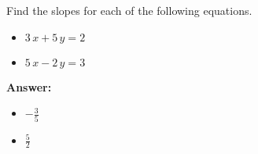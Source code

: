  Find the slopes for each of the following equations. \begin{itemize}\item \( 3 \, x + 5 \, y = 2 \)\item \( 5 \, x - 2 \, y = 3 \)\end{itemize}

        \textbf{Answer:} \begin{itemize}\item \( -\frac{3}{5} \)\item \( \frac{5}{2} \)\end{itemize}
